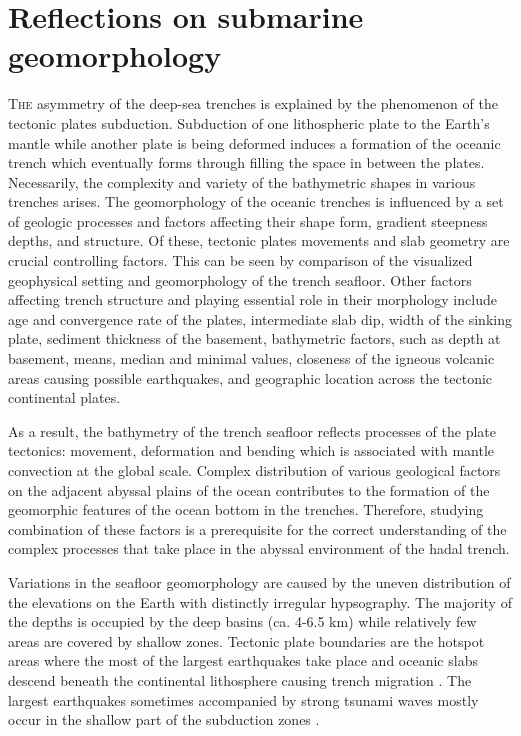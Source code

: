 \documentclass[11pt,a4paper]{report}
\begin{document}
{%
\pagebreak
\section{Reflections on submarine geomorphology}
\lettrine[lines=3]{\color{SteelBlue4}T}{he} asymmetry of the deep-sea trenches is explained by the phenomenon of the tectonic plates subduction. Subduction of one lithospheric plate to the Earth’s mantle while another plate is being deformed induces a formation of the oceanic trench which eventually forms through filling the space in between the plates. Necessarily, the complexity and variety of the bathymetric shapes in various trenches arises. The geomorphology of the oceanic trenches is influenced by a set of geologic processes and factors affecting their shape form, gradient steepness depths, and structure. Of these, tectonic plates movements and slab geometry are crucial controlling factors. This can be seen by comparison of the visualized geophysical setting and geomorphology of the trench seafloor. Other factors affecting trench structure and playing essential role in their morphology include age and convergence rate of the plates, intermediate slab dip, width of the sinking plate, sediment thickness of the basement, bathymetric factors, such as depth at basement, means, median and minimal values, closeness of the igneous volcanic areas causing possible earthquakes, and geographic location across the tectonic continental plates. 

As a result, the bathymetry of the trench seafloor reflects processes of the plate tectonics: movement, deformation and bending which is associated with mantle convection at the global scale. Complex distribution of various geological factors on the adjacent abyssal plains of the ocean contributes to the formation of the geomorphic features of the ocean bottom in the trenches. Therefore, studying combination of these factors is a prerequisite for the correct understanding of the complex processes that take place in the abyssal environment of the hadal trench.

Variations in the seafloor geomorphology are caused by the uneven distribution of the elevations on the Earth with distinctly irregular hypsography. The majority of the depths is occupied by the deep basins (ca. 4-6.5 km) while relatively few areas are covered by shallow zones. Tectonic plate boundaries are the hotspot areas where the most of the largest earthquakes take place and oceanic slabs descend beneath the continental lithosphere causing trench migration \cite{Zhangetal2017}. The largest earthquakes sometimes accompanied by strong tsunami waves mostly occur in the shallow part of the subduction zones \cite{Yu2018}. 

}
\end{document}
